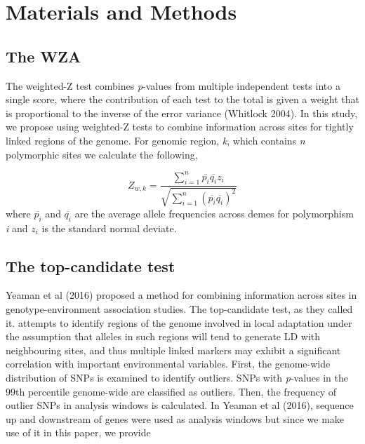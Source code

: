 \documentclass[11pt,twoside,lineno]{GSA_format}
\begin{document}
\section{Materials and Methods}
\label{sec:materials:methods}


\subsection{The WZA} 

The weighted-Z test combines \textit{p}-values from multiple independent tests into a single score, where the contribution of each test to the total is given a weight that is proportional to the inverse of the error variance (Whitlock 2004). In this study, we propose using weighted-Z tests to combine information across sites for tightly linked regions of the genome. For genomic region, \textit{k}, which contains \textit{n} polymorphic sites we calculate the following,

\begin{equation}
\label{weightedZ}
Z_{w,k} =  \frac {\sum\limits_{i=1}^n \overline{p_i} \overline{q_i}z_i}{\sqrt{ \sum\limits_{i=1}^n (\overline{p_i}\overline{q_i})^2} }
\end{equation}
where $\overline{p_i}$ and $\overline{q_i}$ are the average allele frequencies across demes for polymorphism \textit{i} and $z_i$ is the standard normal deviate.



\subsection{The top-candidate test} 

Yeaman et al (2016) proposed a method for combining information across sites in genotype-environment association studies. The top-candidate test, as they called it. attempts to identify regions of the genome involved in local adaptation under the assumption that alleles in such regions will tend to generate LD with neighbouring sites, and thus multiple linked markers may exhibit a significant correlation with important environmental variables. First, the genome-wide distribution of SNPs is examined to identify outliers. SNPs with \textit{p}-values in the 99th percentile genome-wide are classified as outliers. Then, the frequency of outlier SNPs in analysis windows is calculated. In Yeaman et al (2016), sequence up and downstream of genes were used as analysis windows
 but since we make use of it in this paper, we provide 
\end{document}
